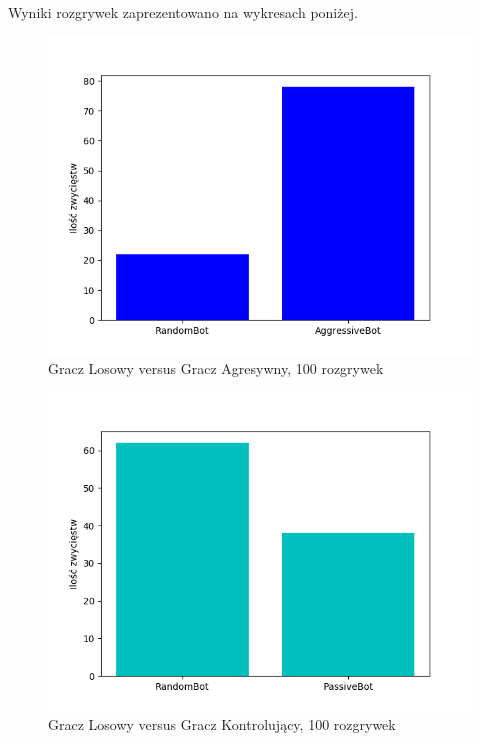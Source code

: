 \documentclass[a4paper, 12pt]{article}
\begin{document}
Wyniki rozgrywek zaprezentowano na wykresach poniżej.

\begin{figure}[H]
	\centering
	\includegraphics[scale=0.75]{100_r_vs_a.png}
	\caption{Gracz Losowy versus Gracz Agresywny, 100 rozgrywek}
\end{figure}

\begin{figure}[H]
	\centering
	\includegraphics[scale=0.75]{100_r_vs_p.png}
	\caption{Gracz Losowy versus Gracz Kontrolujący, 100 rozgrywek}
\end{figure}
\end{document}
